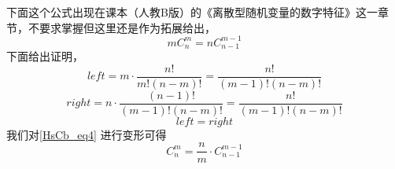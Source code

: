 下面这个公式出现在课本（人教B版）的《离散型随机变量的数字特征》这一章节，不要求掌握但这里还是作为拓展给出，
\begin{equation}\label{HsCb_eq4}
mC_n^m = nC_{n-1}^{m-1}
\end{equation}
下面给出证明，
\begin{equation}
left = m\cdot \frac{n!}{m!(n-m)!} = \frac{n!}{(m-1)!(n-m)!}
\end{equation}
\begin{equation}
right = n\cdot \frac{(n-1)!}{(m-1)!(n-m)!} = \frac{n!}{(m-1)!(n-m)!}
\end{equation}
\begin{equation}
left = right
\end{equation}
我们对\autoref{HsCb_eq4} 进行变形可得
\begin{equation}
C_n^m = \frac{n}{m} \cdot C_{n-1}^{m-1}
\end{equation}